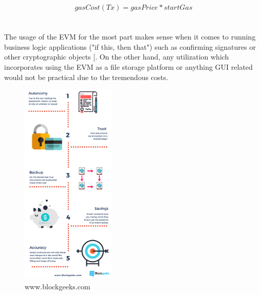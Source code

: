 				\[ gasCost(Tx)= {gasPrice * startGas}\]
\\
\\
The usage of the EVM for the most part makes sense when it comes to running business logic applications ("if this, then that") such as confirming signatures or other cryptographic objects [\cite{relatedWork39}. On the other hand, any utilization which incorporates using the EVM as a file storage platform or anything GUI related would not be practical due to the tremendous costs.



\begin{figure}[h]
\centering
\includegraphics[width=0.4\textwidth]{images/smartcontracts.png}
\caption{\label{fig:Smartcontracts}www.blockgeeks.com}
\end{figure}




\newpage

